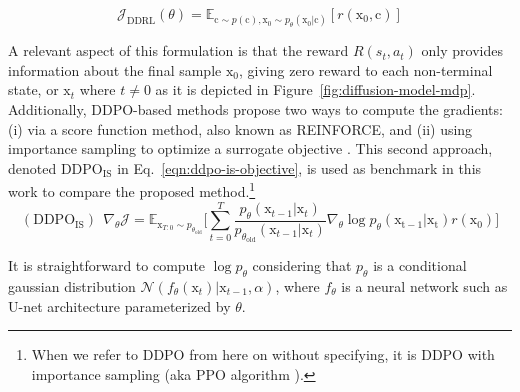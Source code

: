 \begin{equation}\label{difusion-rl-objective-1}
  \mathcal{J}_{\text{DDRL}}(\theta)
  = \mathbb{E}_{\mathrm{c}\sim p(\mathrm{c}),  \mathrm{x}_{0}\sim p_{\theta}(\mathrm{x}_{0}|\mathrm{c})}[ r(\mathrm{x}_{0}, \mathrm{c})]
\end{equation}

\noindent A relevant aspect of this formulation is that the reward $R(s_{t}, a_{t})$
only provides information about the final sample $\mathrm{x}_{0}$, giving zero
reward to each non-terminal state, or $\mathrm{x}_{t}$ where $t\neq0$ as it is
depicted in Figure~\ref{fig:diffusion-model-mdp}. Additionally, DDPO-based methods propose two ways to compute the gradients: (i) via a score function method, also known as REINFORCE, and (ii) using importance sampling to optimize a surrogate objective \cite{schulman2015trust, schulman2017proximal}. This second approach, denoted $\text{DDPO}_{\text{IS}}$ in Eq.~\eqref{eqn:ddpo-is-objective}, is used as benchmark in this work to compare the proposed method.\footnote{When we refer to DDPO from here on without specifying, it is DDPO with importance sampling (aka PPO algorithm \citep{schulman2017proximal}).} 
\begin{equation}\label{eqn:ddpo-is-objective}
  (\text{DDPO}_{\text{IS}})~~ \nabla_{\theta}\mathcal{J} = \mathbb{E}_{\mathrm{x}_{T:0}\sim p_{\theta_{\text{old}}}} \bigg[\sum_{t=0}^{T}\frac{p_{\theta}(\mathrm{x}_{t-1}|\mathrm{x}_{t})}{p_{\theta_{\text{old}}}(\mathrm{x}_{t-1}|\mathrm{x}_{t})}\nabla_{\theta}\log p_{\theta}(\mathrm{x_{t-1}|\mathrm{x}_t}) r(\mathrm{x}_{0})\bigg]
\end{equation}

\noindent It is straightforward to compute $\log p_{\theta}$ considering that
$p_{\theta}$ is a conditional gaussian distribution 
$\mathcal{N}(f_{\theta}(\mathrm{x}_{t}) | \mathrm{x}_{t-1}, \alpha)$, where
$f_{\theta}$ is a neural network such as U-net architecture parameterized by $\theta$. 

